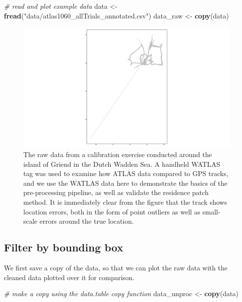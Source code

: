 \documentclass[
]{scrartcl}
\newenvironment{Shaded}{}{}
\newcommand{\CommentTok}[1]{\textcolor[rgb]{0.38,0.63,0.69}{\textit{#1}}}
\newcommand{\KeywordTok}[1]{\textcolor[rgb]{0.00,0.44,0.13}{\textbf{#1}}}
\newcommand{\NormalTok}[1]{#1}
\newcommand{\StringTok}[1]{\textcolor[rgb]{0.25,0.44,0.63}{#1}}
\begin{document}
\begin{Shaded}
\begin{Highlighting}[]
\CommentTok{\# read and plot example data}
\NormalTok{data <{-}}\StringTok{ }\KeywordTok{fread}\NormalTok{(}\StringTok{"data/atlas1060\_allTrials\_annotated.csv"}\NormalTok{)}
\NormalTok{data\_raw <{-}}\StringTok{ }\KeywordTok{copy}\NormalTok{(data)}
\end{Highlighting}
\end{Shaded}

\begin{figure}
\centering
\includegraphics{figures/fig_calibration_raw.png}
\caption{The raw data from a calibration exercise conducted around the island of Griend in the Dutch Wadden Sea. A handheld WATLAS tag was used to examine how ATLAS data compared to GPS tracks, and we use the WATLAS data here to demonstrate the basics of the pre-processing pipeline, as well as validate the residence patch method. It is immediately clear from the figure that the track shows location errors, both in the form of point outliers as well as small-scale errors around the true location.}
\end{figure}

\hypertarget{filter-by-bounding-box}{%
\subsection{Filter by bounding box}\label{filter-by-bounding-box}}

We first save a copy of the data, so that we can plot the raw data with the cleaned data plotted over it for comparison.

\begin{Shaded}
\begin{Highlighting}[]
\CommentTok{\# make a copy using the data.table copy function}
\NormalTok{data\_unproc <{-}}\StringTok{ }\KeywordTok{copy}\NormalTok{(data)}
\end{Highlighting}
\end{Shaded}
\end{document}
